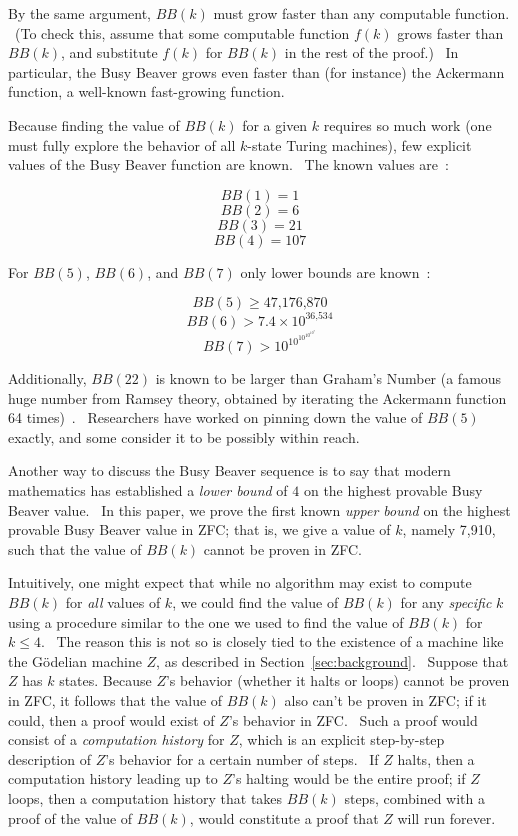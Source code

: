 \documentclass[11pt]{article}
\newcommand{\statenumcomma}{7,910, }
\begin{document}
By the same argument, $BB(k)$ must grow faster than any computable function. \ (To check this, assume that some computable function $f(k)$ grows faster than $BB(k)$, and substitute $f(k)$ for $BB(k)$ in the rest of the proof.) \ In particular, the Busy Beaver grows even faster than (for instance) the Ackermann function, a well-known fast-growing function.

Because finding the value of $BB(k)$ for a given $k$ requires so much work (one must fully explore the behavior of all $k$-state Turing machines), few explicit values of the Busy Beaver function are known. \ The known values are~\cite{bbfour,bbsmall}:

$$BB(1) = 1$$
$$BB(2) = 6$$
$$BB(3) = 21$$
$$BB(4) = 107$$

For $BB(5)$, $BB(6)$, and $BB(7)$ only lower bounds are known~\cite{bbvalues,bigbbvalues}:

$$BB(5) \ge \textrm{47,176,870}$$
$$BB(6) > 7.4 \times 10^{\textrm{36,534}}$$
$$BB(7) > 10^{10^{10^{10^{10^7}}}}$$

Additionally, $BB(22)$ is known to be larger than Graham's Number (a famous huge number from Ramsey theory, obtained by iterating the Ackermann function 64 times)~\cite{grahamsnumber}. \ Researchers have worked on pinning down the value of $BB(5)$ exactly, and some consider it to be possibly within reach.

Another way to discuss the Busy Beaver sequence is to say that modern mathematics has established a \emph{lower bound} of $4$ on the highest provable Busy Beaver value. \ In this paper, we prove the first known \emph{upper bound} on the highest provable Busy Beaver value in ZFC; that is, we give a value of $k$, namely \statenumcomma such that the value of $BB(k)$ cannot be proven in ZFC.

Intuitively, one might expect that while no algorithm may exist to compute $BB(k)$ for \emph{all} values of $k$, we could find the value of $BB(k)$ for any \emph{specific} $k$ using a procedure similar to the one we used to find the value of $BB(k)$ for $k \le 4$. \ The reason this is not so is closely tied to the existence of a machine like the G\"{o}delian machine $Z$, as described in Section~\ref{sec:background}. \ Suppose that $Z$ has $k$ states. Because $Z$'s behavior (whether it halts or loops) cannot be proven in ZFC, it follows that the value of $BB(k)$ also can't be proven in ZFC; if it could, then a proof would exist of $Z$'s behavior in ZFC. \ Such a proof would consist of a \emph{computation history} for $Z$, which is an explicit step-by-step description of $Z$'s behavior for a certain number of steps. \ If $Z$ halts, then a computation history leading up to $Z$'s halting would be the entire proof; if $Z$ loops, then a computation history that takes $BB(k)$ steps, combined with a proof of the value of $BB(k)$, would constitute a proof that $Z$ will run forever.
\end{document}
